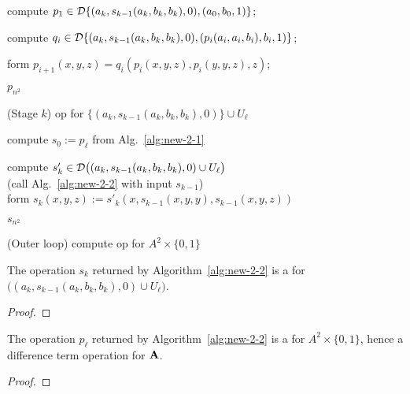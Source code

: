 \begin{algorithm}  
  
  compute $p_1 \in \mathcal{D} \{(a_k, s_{k-1}(a_k,b_k,b_k), 0), (a_0, b_0, 1)\}$;
  
   {
    compute $q_i\in \mathcal{D} \{(a_k, s_{k-1}(a_k,b_k,b_k), 0), (p_i(a_i, a_i, b_i), b_i, 1)\}$;
  
    form $p_{i+1}(x,y,z) = q_i(p_i(x,y,z), p_i(y,y,z), z)$;
  }
  
  \Return $p_{n^2}$
  \caption{(Stage $k$) \ldt op for $\{(a_k, s_{k-1}(a_k, b_k, b_k), 0)\} \cup U_{\ell}$\label{alg:new-2-2}}
\end{algorithm}



\begin{algorithm}  
  
  compute $s_0 := p_{\ell}$ from Alg.~\ref{alg:new-2-1}
  
   {
    
    compute $s'_k \in \mathcal{D} \bigl((a_k, s_{k-1}(a_k, b_k, b_k), 0) \cup U_{\ell}\bigr)$\\
    (call Alg.~\ref{alg:new-2-2} with input $s_{k-1}$)\\[4pt]

    form $s_k(x,y,z) := s'_k(x, s_{k-1}(x,y,y), s_{k-1}(x,y,z))$
  }
  \Return $s_{n^2}$
  \caption{(Outer loop) compute \ldt  op for $A^2 \times \{0,1\}$\label{alg:new-2-3}}
\end{algorithm}





\begin{lemma}
The operation $s_k$ returned by Algorithm~\ref{alg:new-2-2}
is a \ldto for $\bigl((a_k, s_{k-1}(a_k, b_k, b_k), 0) \cup U_\ell\bigr)$.
\end{lemma}
\begin{proof}
\end{proof}

\begin{prop}
  The operation $p_{\ell}$ returned by Algorithm~\ref{alg:new-2-2} is a \ldto for $A^2 \times \{0,1\}$, hence a difference term operation for $\mathbf{A}$.
\end{prop}
    
\begin{proof}
\end{proof}


